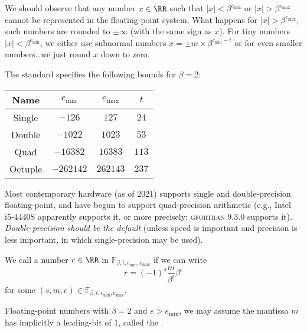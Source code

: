 \begin{ddanger}
  We should observe that any number $x\in\RR$ such that $|x|<\beta^{e_{\text{min}}}$
  or $|x|>\beta^{e_{\text{max}}}$ cannot be represented in
  the floating-point system. What happens for
  $|x|>\beta^{e_{\text{max}}}$, such numbers are rounded to $\pm\infty$
  (with the same sign as $x$). For tiny numbers $|x|<\beta^{e_{\text{min}}}$,
  we either use subnormal numbers $x=\pm m\times\beta^{e_{\text{min}}-t}$
  or for even smaller numbers\dots we just round $x$ down to zero.
\end{ddanger}


\begin{rmk}
  The  standard specifies the following bounds for $\beta=2$:
  \begin{center}
    \bgroup
    \def\arraystretch{1.125}
    \begin{tabular}{|c|c|c|c|}
      Name   & $e_{\text{min}}$ & $e_{\text{max}}$ & $t$ \\\hline
      Single & $-126$         & $127$          & $24$\\
      Double & $-1022$        & $1023$         & $53$\\
      Quad   & $-16382$       & $16383$        & $113$\\
      Octuple & $-262142$     & $262143$       & $237$
    \end{tabular}
    \egroup
  \end{center}
  Most contemporary hardware (as of 2021) supports single and
  double-precision floating-point, and have begun to support
  quad-precision arithmetic (e.g., Intel i5-4440S apparently supports
  it, or more precisely: \textsc{gfortran} $9.3.0$ supports
  it). \emph{Double-precision should be the default} (unless speed is important
  and precision is less important, in which single-precision may be used).
\end{rmk}


\begin{defn}
  We call a number $r\in\RR$  in
  $\mathbb{F}_{\beta,t,e_{\text{min}},e_{\text{max}}}$ if we can write
  \begin{equation}
    r = (-1)^{s}\frac{m}{\beta^{t}}\beta^{e}
  \end{equation}
  for some $(s,m,e)\in\mathbb{F}_{\beta,t,e_{\text{min}},e_{\text{max}}}$.
\end{defn}


\begin{defn}
  Floating-point numbers with $\beta=2$ and $e>e_{\text{min}}$, we may
  assume the mantissa $m$ has implicitly a leading-bit of 1,
  called the .
\end{defn}


